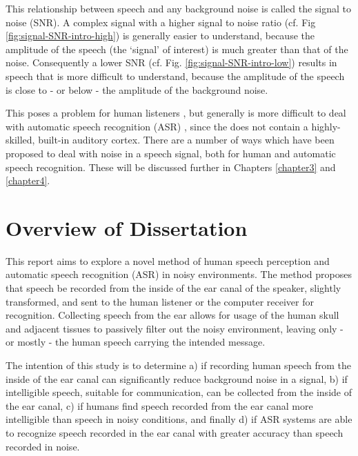 This relationship between speech and any background noise is called the signal to noise \DIFdelbegin {}\DIFdelend \DIFaddbegin {}\DIFaddend (SNR).  A complex signal with a higher signal to noise ratio (cf. Fig \ref{fig:signal-SNR-intro-high}) is generally easier to understand, because the amplitude of the speech (the `signal' of interest) is much greater than that of the noise.  Consequently a lower SNR (cf. Fig. \ref{fig:signal-SNR-intro-low}) results in speech that is more difficult to understand, because the amplitude of the speech is close to - or below - the amplitude of the background noise.  \DIFaddbegin {}\DIFaddend 

This poses a problem for human listeners \DIFaddbegin {}\DIFaddend , but generally is more difficult to deal with \DIFdelbegin {}\DIFdelend \DIFaddbegin {}\DIFaddend automatic speech recognition (ASR) \DIFaddbegin {}\DIFaddend , since the \DIFdelbegin {}\DIFdelend \DIFaddbegin {}\DIFaddend does not contain a highly-skilled, built-in auditory cortex.  There are a number of ways which have been proposed to deal with noise in a speech signal, both for human and automatic speech recognition.  These will be discussed further in Chapters \ref{chapter3} and \ref{chapter4}.

\section{Overview of Dissertation}\label{ch1:diss-overview}

This report aims to explore a novel method of human speech perception and automatic speech recognition (ASR) in noisy environments.  The method proposes that speech be recorded from the inside of the ear canal of the speaker, slightly transformed, and sent to the human listener or the computer receiver for recognition.  Collecting speech from the ear allows for usage of the human skull and adjacent tissues to passively filter out the noisy environment, leaving only - or mostly - the human speech carrying the intended message.  

The intention of this study is to determine a) if recording human speech from the inside of the ear canal can significantly reduce background noise in a signal, b) if intelligible speech, suitable for communication, can be collected from the inside of the ear canal, c) if humans find speech recorded from the ear canal more intelligible than speech in noisy conditions, and finally d) if ASR systems are able to recognize speech recorded in the ear canal with greater accuracy than speech recorded in noise.

